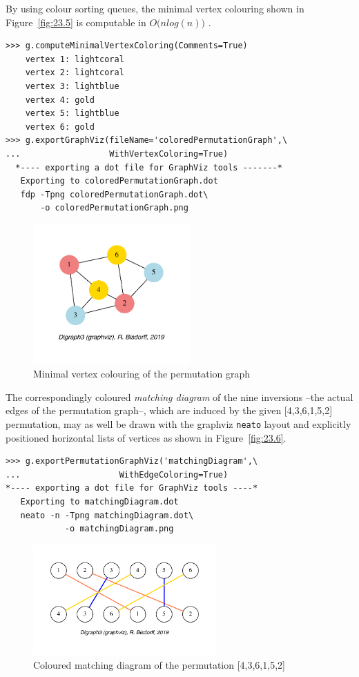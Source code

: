 By using colour sorting queues, the minimal vertex colouring shown in Figure~\vref{fig:23.5} is computable in $O\big(n log(n)\big)$ \citep{GOL-2004}.
\begin{lstlisting}
>>> g.computeMinimalVertexColoring(Comments=True)
    vertex 1: lightcoral
    vertex 2: lightcoral
    vertex 3: lightblue
    vertex 4: gold
    vertex 5: lightblue
    vertex 6: gold
>>> g.exportGraphViz(fileName='coloredPermutationGraph',\
...                  WithVertexColoring=True)
  *---- exporting a dot file for GraphViz tools -------*
   Exporting to coloredPermutationGraph.dot
   fdp -Tpng coloredPermutationGraph.dot\
       -o coloredPermutationGraph.png
\end{lstlisting}
\begin{figure}[ht]
\sidecaption[t]
\includegraphics[width=6cm]{Figures/23-5-coloredPermutationGraph.pdf}
\caption{Minimal vertex colouring of the permutation graph} 
\label{fig:23.5}       %
\end{figure}

The correspondingly coloured \emph{matching diagram} of the nine inversions --the actual edges of the permutation graph--, which are induced by the given [4,3,6,1,5,2] permutation, may as well be drawn with the graphviz \texttt{neato} layout and explicitly positioned horizontal lists of vertices as shown in Figure~\vref{fig:23.6}.
\begin{lstlisting}
>>> g.exportPermutationGraphViz('matchingDiagram',\
...                    WithEdgeColoring=True)
*---- exporting a dot file for GraphViz tools ----*
   Exporting to matchingDiagram.dot
   neato -n -Tpng matchingDiagram.dot\
            -o matchingDiagram.png
\end{lstlisting}
\begin{figure}[ht]
\sidecaption[t]
\includegraphics[width=7cm]{Figures/23-6-perm_permutationGraph.pdf}
\caption{Coloured matching diagram of the permutation [4,3,6,1,5,2]} 
\label{fig:23.6}       %
\end{figure}

